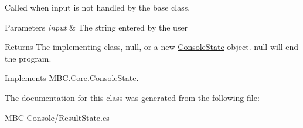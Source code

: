 Called when input is not handled by the base class.


\begin{DoxyParams}{Parameters}
{\em input} & The string entered by the user\\
\hline
\end{DoxyParams}
\begin{DoxyReturn}{Returns}
The implementing class, null, or a new \hyperlink{class_m_b_c_1_1_core_1_1_console_state}{Console\-State} object. null will end the program.
\end{DoxyReturn}


Implements \hyperlink{class_m_b_c_1_1_core_1_1_console_state_aaaa5118a38bedd856e55fa26601a5f3d}{M\-B\-C.\-Core.\-Console\-State}.



The documentation for this class was generated from the following file\-:\begin{DoxyCompactItemize}
\item 
M\-B\-C Console/Result\-State.\-cs\end{DoxyCompactItemize}
